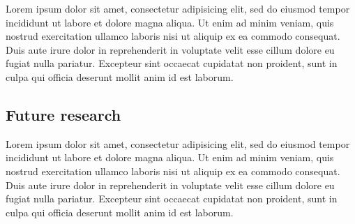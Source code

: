 \documentclass{sigchi}
\begin{document}
Lorem ipsum dolor sit amet, consectetur adipisicing elit, sed do eiusmod tempor incididunt ut labore et dolore magna aliqua. Ut enim ad minim veniam, quis nostrud exercitation ullamco laboris nisi ut aliquip ex ea commodo consequat. Duis aute irure dolor in reprehenderit in voluptate velit esse cillum dolore eu fugiat nulla pariatur. Excepteur sint occaecat cupidatat non proident, sunt in culpa qui officia deserunt mollit anim id est laborum.

\subsection{Future research}

Lorem ipsum dolor sit amet, consectetur adipisicing elit, sed do eiusmod tempor incididunt ut labore et dolore magna aliqua. Ut enim ad minim veniam, quis nostrud exercitation ullamco laboris nisi ut aliquip ex ea commodo consequat. Duis aute irure dolor in reprehenderit in voluptate velit esse cillum dolore eu fugiat nulla pariatur. Excepteur sint occaecat cupidatat non proident, sunt in culpa qui officia deserunt mollit anim id est laborum.

\balance{}



\end{document}
